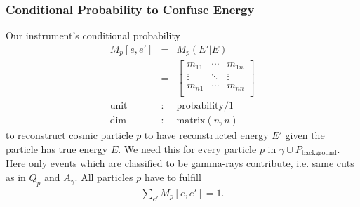 \documentclass{article}%
\begin{document}
\subsubsection*{Conditional Probability to Confuse Energy}
%
Our instrument's conditional probability
%
\begin{eqnarray*}
M_p[e, e'] &=& M_p(E' \vert E)\\
&=&
  \left[ {\begin{array}{ccc}
    m_{11} & \cdots & m_{1n}\\
    \vdots & \ddots & \vdots\\
    m_{n1} & \cdots & m_{nn}\\
  \end{array} } \right]\\
\text{unit} &:& \text{probability}/1\\
\text{dim} &:& \text{matrix}(n,n)
\end{eqnarray*}
%
to reconstruct cosmic particle $p$ to have reconstructed energy $E'$ given the particle has true energy $E$.
%
We need this for every particle $p$ in $\gamma \cup P_\text{background}$.
%
Here only events which are classified to be gamma-rays contribute, i.e. same cuts as in $Q_p$ and $A_\gamma$.
%
All particles $p$ have to fulfill
%
\begin{eqnarray*}
\sum_{e'} M_p[e, e'] = 1.
\end{eqnarray*}
%
\end{document}
